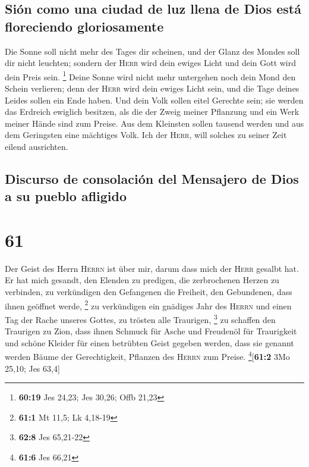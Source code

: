 \hypertarget{siuxf3n-como-una-ciudad-de-luz-llena-de-dios-estuxe1-floreciendo-gloriosamente}{%
\subsection{Sión como una ciudad de luz llena de Dios está floreciendo
gloriosamente}\label{siuxf3n-como-una-ciudad-de-luz-llena-de-dios-estuxe1-floreciendo-gloriosamente}}

 Die Sonne soll nicht mehr des Tages dir scheinen, und
der Glanz des Mondes soll dir nicht leuchten; sondern der \textsc{Herr}
wird dein ewiges Licht und dein Gott wird dein Preis sein. \footnote{\textbf{60:19}
  Jes 24,23; Jes 30,26; Offb 21,23}  Deine Sonne wird
nicht mehr untergehen noch dein Mond den Schein verlieren; denn der
\textsc{Herr} wird dein ewiges Licht sein, und die Tage deines Leides
sollen ein Ende haben.  Und dein Volk sollen eitel
Gerechte sein; sie werden das Erdreich ewiglich besitzen, als die der
Zweig meiner Pflanzung und ein Werk meiner Hände sind zum Preise.
 Aus dem Kleinsten sollen tausend werden und aus dem
Geringsten eine mächtiges Volk. Ich der \textsc{Herr}, will solches zu
seiner Zeit eilend ausrichten.

\hypertarget{discurso-de-consolaciuxf3n-del-mensajero-de-dios-a-su-pueblo-afligido}{%
\subsection{Discurso de consolación del Mensajero de Dios a su pueblo
afligido}\label{discurso-de-consolaciuxf3n-del-mensajero-de-dios-a-su-pueblo-afligido}}

\hypertarget{section-60}{%
\section{61}\label{section-60}}

 Der Geist des Herrn \textsc{Herrn} ist über mir, darum
dass mich der \textsc{Herr} gesalbt hat. Er hat mich gesandt, den
Elenden zu predigen, die zerbrochenen Herzen zu verbinden, zu
verkündigen den Gefangenen die Freiheit, den Gebundenen, dass ihnen
geöffnet werde, \footnote{\textbf{61:1} Mt 11,5; Lk 4,18-19}
 zu verkündigen ein gnädiges Jahr des \textsc{Herrn} und
einen Tag der Rache unseres Gottes, zu trösten alle Traurigen,
\footnote{\textbf{62:8} Jes 65,21-22}  zu schaffen den
Traurigen zu Zion, dass ihnen Schmuck für Asche und Freudenöl für
Traurigkeit und schöne Kleider für einen betrübten Geist gegeben werden,
dass sie genannt werden Bäume der Gerechtigkeit, Pflanzen des
\textsc{Herrn} zum Preise. \footnote{\textbf{61:6} Jes 66,21}{[}\textbf{61:2}
3Mo 25,10; Jes 63,4{]}

